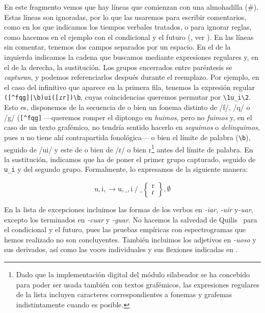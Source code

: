 En este fragmento vemos que hay líneas que comienzan con una almohadilla (\#). Estas líneas son ignoradas, por lo que las usaremos para escribir comentarios, como en los que indicamos los tiempos verbales tratados, o para  ignorar reglas, como hacemos en el ejemplo con el condicional y el futuro (\cite[184-186]{quilis2019}, ver ). En las líneas sin comentar, tenemos dos campos separados por un espacio. En el de la izquierda indicamos la cadena que buscamos mediante expresiones regulares y, en el de la derecha, la sustitución. Los grupos encerrados entre paréntesis se \textit{capturan}, y podemos referenciarlos después durante el reemplazo. Por ejemplo, en el caso del infinitivo que aparece en la primera fila, tenemos la expresión regular \texttt{([\^{}fqg]|\textbackslash b)ui([ɾr])\textbackslash b}, cuyas coincidencias queremos permutar por \texttt{\textbackslash 1u\_i\textbackslash 2}. Esto es, disponemos de la secuencia de o bien un fonema distinto de /f/, /q/ o /g/  (\texttt{[\^{}fqg]} —queremos romper el diptongo en \textit{huimos}, pero no \textit{fuimos} y, en el caso de un texto grafémico, no tendría sentido hacerlo en \textit{seguimos} o \textit{delinquimos}, pues \textlangle{}u\textrangle{} no tiene ahí contrapartida fonológica— o bien el límite de palabra (\texttt{\textbackslash b}), seguido de /ui/ y este de o bien de /ɾ/ o bien \textlangle{}r\textrangle{}\footnote{Dado que la implementación digital del módulo silabeador se ha concebido para poder ser usada también con textos grafémicos, las expresiones regulares de la lista incluyen caracteres correspondientes a fonemas y grafemas indistintamente cuando es posible.} antes del límite de palabra. En la sustitución, indicamos que ha de poner el primer grupo capturado, seguido de \texttt{u\_i} y del segundo grupo. Formalmente, lo expresamos de la siguiente manera:

\[\text{u}, \text{i}, \longrightarrow  \text{u}, \text{\_}, \text{i} \;/\; \_  \left\{  \begin{smallmatrix} {\text{r}}  \\ { \text{ɾ}} \end{smallmatrix} \right\}, \emptyset  \]

En la lista de excepciones incluimos las formas de los verbos en \textit{-iar}, \textit{-uir} y\textit{-uar}, excepto los terminados en\textit{ -cuar} y \textit{-guar}. No hacemos la salvedad de Quilis~\parencite*[185]{quilis2019} para el condicional y el futuro, pues las pruebas empíricas con espectrogramas que hemos realizado no son concluyentes.  También incluimos los adjetivos en \textit{-uoso} y sus derivados, así como las voces individuales y sus flexiones indicadas en .

